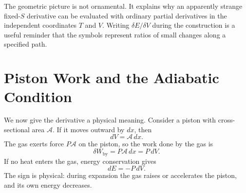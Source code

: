 The geometric picture is not ornamental.  It explains why an apparently
strange fixed-\(S\) derivative can be evaluated with ordinary partial
derivatives in the independent coordinates \(T\) and \(V\).  Writing
\(\delta E/\delta V\) during the construction is a useful reminder that the
symbols represent ratios of small changes along a specified path.

\begin{classroomqa}
\end{classroomqa}

\begin{classroomqa}
\end{classroomqa}

\section{Piston Work and the Adiabatic Condition}

We now give the derivative a physical meaning.  Consider a piston with
cross-sectional area \(\mathcal A\).  If it moves outward by \(dx\), then
\begin{equation}
 dV=\mathcal A\,dx.
 \label{eq:sm5-piston-volume}
\end{equation}
The gas exerts force \(P\mathcal A\) on the piston, so the work done by the
gas is
\begin{equation}
 \delta W_{\mathrm{by}}=P\mathcal A\,dx=P\,dV.
 \label{eq:sm5-piston-work}
\end{equation}
If no heat enters the gas, energy conservation gives
\begin{equation}
 dE=-P\,dV.
 \label{eq:sm5-adiabatic-work}
\end{equation}
The sign is physical: during expansion the gas raises or accelerates the
piston, and its own energy decreases.

